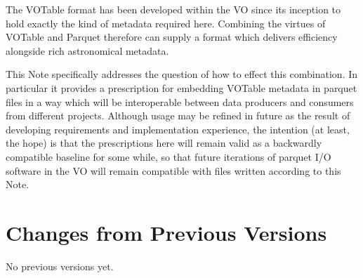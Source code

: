 \documentclass[11pt,a4paper]{ivoa}
\begin{document}
The VOTable format has been developed within the VO since its
inception to hold exactly the kind of metadata required here.
Combining the virtues of VOTable and Parquet therefore
can supply a format which delivers efficiency alongside
rich astronomical metadata.

This Note specifically addresses the question of how to
effect this combination.
In particular it provides a prescription for embedding
VOTable metadata in parquet files in a way which will be interoperable
between data producers and consumers from different projects.
Although usage may be refined in future as the result of
developing requirements and implementation experience,
the intention (at least, the hope) is that the
prescriptions here will remain valid as a backwardly compatible
baseline for some while, so that future iterations of parquet I/O
software in the VO will remain compatible with files written
according to this Note.

\appendix
\section{Changes from Previous Versions}

No previous versions yet.


\end{document}
